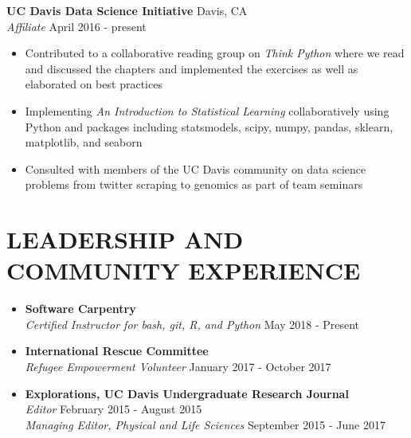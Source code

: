 \documentclass[line,margin,10pt]{res}
\begin{document}
\begin{resume}
\textbf{UC Davis Data Science Initiative} \hfill  Davis, CA \\
{\sl Affiliate} \hfill April 2016 - present
\begin{itemize} \itemsep -2pt
\item Contributed to a collaborative reading group on {\sl Think Python} where we read and discussed the chapters and implemented the exercises as well as elaborated on best practices
\item Implementing {\sl An Introduction to Statistical Learning} collaboratively using Python and packages including statsmodels, scipy, numpy, pandas, sklearn, matplotlib, and seaborn
\item Consulted with members of the UC Davis community on data science problems from twitter scraping to genomics as part of team seminars
\end{itemize}
 
\section{LEADERSHIP AND COMMUNITY EXPERIENCE}
\begin{itemize}\itemsep -2pt

\item [] \textbf{Software Carpentry} \\ {\sl Certified Instructor for bash, git, R, and Python} \hfill May 2018 - Present

\item [] \textbf{International Rescue Committee} \\ {\sl Refugee Empowerment Volunteer} \hfill January 2017 - October 2017

\item [] \textbf{Explorations, UC Davis Undergraduate Research Journal} \\
{\sl Editor} \hfill February 2015 - August 2015\\
{\sl Managing Editor, Physical and Life Sciences} \hfill September 2015 - June 2017
  



\end{itemize}
 

\end{resume}
\end{document}
